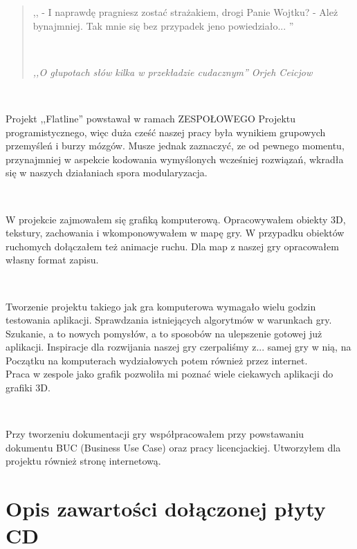 \documentclass[licencjacka]{pracamgr}
\begin{document}
\begin{quote}

    ,,
  \newline - I naprawdę pragniesz zostać strażakiem, drogi Panie Wojtku?
  \newline - Ależ bynajmniej. Tak mnie się bez przypadek jeno powiedziało...
  ''

  \ \

\raggedleft\slshape ,,O głupotach słów kilka w przekładzie cudacznym'' Orjeh Ceicjow
\end{quote}

\ \

Projekt ,,Flatline'' powstawał w ramach ZESPOŁOWEGO Projektu
programistycznego, więc duża cześć naszej pracy była wynikiem
grupowych przemyśleń i burzy mózgów. Musze jednak zaznaczyć, ze od
pewnego momentu, przynajmniej w aspekcie kodowania wymyślonych
wcześniej rozwiązań, wkradła się w naszych działaniach spora
modularyzacja.

\ \

W projekcie zajmowałem się grafiką komputerową. Opracowywałem 
obiekty 3D, tekstury, zachowania i wkomponowywałem w mapę gry. 
W przypadku obiektów ruchomych dołączałem też animacje ruchu. 
Dla map z naszej gry opracowałem własny format zapisu.

\ \

Tworzenie projektu takiego jak gra komputerowa wymagało
wielu godzin testowania aplikacji. Sprawdzania istniejących 
algorytmów w warunkach gry. Szukanie, a to nowych pomysłów, 
a to sposobów na ulepszenie gotowej już aplikacji. Inspiracje 
dla rozwijania naszej gry czerpaliśmy z... samej gry w nią, na 
Początku na komputerach wydziałowych potem również przez internet.  \\
Praca w zespole jako grafik pozwoliła mi poznać wiele 
ciekawych aplikacji do grafiki 3D.

\ \

Przy tworzeniu dokumentacji gry współpracowałem przy powstawaniu
dokumentu BUC (Business Use Case) oraz pracy licencjackiej.
Utworzyłem dla projektu również stronę internetową. 



\chapter{Opis zawartości dołączonej płyty CD}
\end{document}

